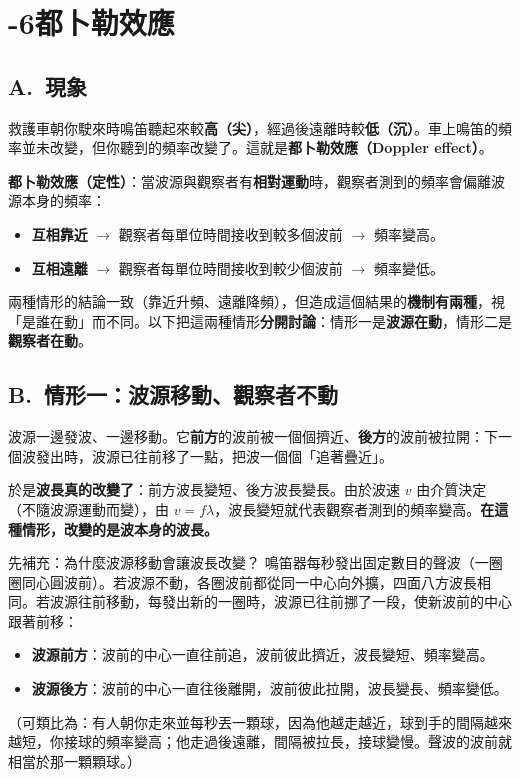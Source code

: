 \documentclass[11pt]{article}
\begin{document}
\section*{-6\quad 都卜勒效應}

\subsection*{\sffamily A.\ 現象}

救護車朝你駛來時鳴笛聽起來較\textbf{高（尖）}，經過後遠離時較\textbf{低（沉）}。車上鳴笛的頻率並未改變，但你聽到的頻率改變了。這就是\textbf{都卜勒效應（Doppler effect）}。

\textbf{都卜勒效應（定性）}：當波源與觀察者有\textbf{相對運動}時，觀察者測到的頻率會偏離波源本身的頻率：

\begin{itemize}\setlength{\itemsep}{1pt}
\item \textbf{互相靠近} $\rightarrow$ 觀察者每單位時間接收到較多個波前 $\rightarrow$ 頻率變高。
\item \textbf{互相遠離} $\rightarrow$ 觀察者每單位時間接收到較少個波前 $\rightarrow$ 頻率變低。
\end{itemize}

兩種情形的結論一致（靠近升頻、遠離降頻），但造成這個結果的\textbf{機制有兩種}，視「是誰在動」而不同。以下把這兩種情形\textbf{分開討論}：情形一是\textbf{波源在動}，情形二是\textbf{觀察者在動}。

\subsection*{\sffamily B.\ 情形一：波源移動、觀察者不動}

波源一邊發波、一邊移動。它\textbf{前方}的波前被一個個擠近、\textbf{後方}的波前被拉開：下一個波發出時，波源已往前移了一點，把波一個個「追著疊近」。

於是\textbf{波長真的改變了}：前方波長變短、後方波長變長。由於波速 $v$ 由介質決定（不隨波源運動而變），由 $v=f\lambda$，波長變短就代表觀察者測到的頻率變高。\textbf{在這種情形，改變的是波本身的波長。}


\begin{補充框}{先補充：為什麼波源移動會讓波長改變？}
鳴笛器每秒發出固定數目的聲波（一圈圈同心圓波前）。若波源不動，各圈波前都從同一中心向外擴，四面八方波長相同。若波源往前移動，每發出新的一圈時，波源已往前挪了一段，使新波前的中心跟著前移：

\begin{itemize}\setlength{\itemsep}{1pt}
\item \textbf{波源前方}：波前的中心一直往前追，波前彼此擠近，波長變短、頻率變高。
\item \textbf{波源後方}：波前的中心一直往後離開，波前彼此拉開，波長變長、頻率變低。
\end{itemize}
（可類比為：有人朝你走來並每秒丟一顆球，因為他越走越近，球到手的間隔越來越短，你接球的頻率變高；他走過後遠離，間隔被拉長，接球變慢。聲波的波前就相當於那一顆顆球。）
\end{補充框}
\end{document}
